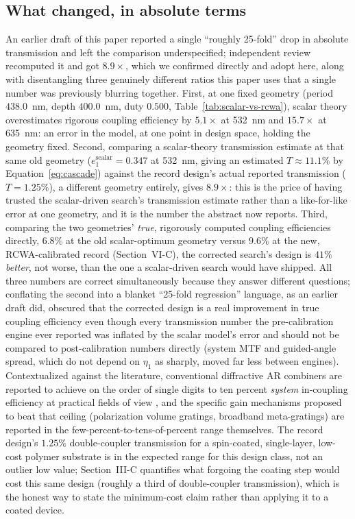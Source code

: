 \documentclass[10pt,twocolumn]{article}
\begin{document}
\subsection{What changed, in absolute terms}
An earlier draft of this paper reported a single ``roughly 25-fold'' drop
in absolute transmission and left the comparison underspecified; independent
review recomputed it and got $8.9\times$, which we confirmed directly and
adopt here, along with disentangling three genuinely different ratios this
paper uses that a single number was previously blurring together. First,
at one fixed geometry (period $438.0$~nm, depth $400.0$~nm, duty $0.500$,
Table~\ref{tab:scalar-vs-rcwa}), scalar theory overestimates rigorous
coupling efficiency by $5.1\times$ at 532~nm and $15.7\times$ at 635~nm: an
error in the model, at one point in design space, holding the geometry
fixed. Second, comparing a scalar-theory transmission estimate at that same
old geometry ($e_1^{\mathrm{scalar}}=0.347$ at 532~nm, giving an estimated
$T\approx11.1\%$ by Equation~\eqref{eq:cascade}) against the record design's
actual reported transmission ($T=1.25\%$), a different geometry entirely,
gives $8.9\times$: this is the price of having trusted the scalar-driven
search's transmission estimate rather than a like-for-like error at one
geometry, and it is the number the abstract now reports. Third, comparing
the two geometries' \emph{true}, rigorously computed coupling efficiencies
directly, $6.8\%$ at the old scalar-optimum geometry versus $9.6\%$ at the
new, RCWA-calibrated record (Section~VI-C), the corrected search's design is
$41\%$ \emph{better}, not worse, than the one a scalar-driven search would
have shipped. All three numbers are correct simultaneously because they
answer different questions; conflating the second into a blanket ``25-fold
regression'' language, as an earlier draft did, obscured that the
corrected design is a real improvement in true coupling efficiency even
though every transmission number the pre-calibration engine ever reported
was inflated by the scalar model's error and should not be compared to
post-calibration numbers directly (system MTF and guided-angle spread, which
do not depend on $\eta_1$ as sharply, moved far less between engines).
Contextualized against the literature, conventional
diffractive AR combiners are reported to achieve on the order of single
digits to ten percent \emph{system} in-coupling efficiency at practical
fields of view \cite{zhao2024}, and the specific gain mechanisms proposed
to beat that ceiling (polarization volume gratings, broadband
meta-gratings) are reported in the few-percent-to-tens-of-percent range
themselves. The record design's $1.25\%$ double-coupler
transmission for a spin-coated, single-layer, low-cost polymer substrate
is in the expected range for this design class, not an outlier low value;
Section~III-C quantifies what forgoing the coating step would cost this
same design (roughly a third of double-coupler transmission), which is the
honest way to state the minimum-cost claim rather than applying it to a
coated device.
\end{document}
